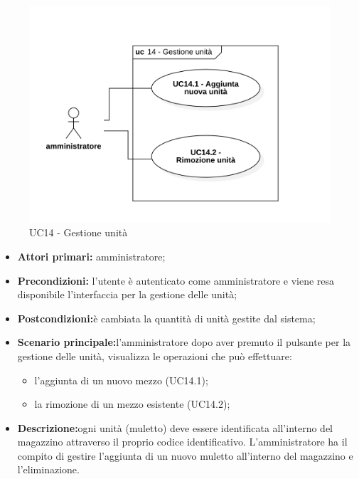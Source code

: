 \begin{figure}[H]
	\centering
	\includegraphics[scale=0.52]{res/images/uc14.png}
	\caption{UC14 - Gestione unità}
\end{figure}

\begin{itemize}
	\item 	\textbf{Attori primari:} amministratore;
	\item 	\textbf{Precondizioni:} l’utente è autenticato come amministratore e viene resa disponibile l’interfaccia per la gestione delle unità;
	\item 	\textbf{Postcondizioni:}è cambiata la quantità di unità gestite dal sistema;
	\item 	\textbf{Scenario principale:}l’amministratore dopo aver premuto il pulsante per la gestione delle unità, visualizza le operazioni che può effettuare:
	\begin{itemize}
		\item l’aggiunta di un nuovo mezzo (UC14.1);
		\item la rimozione di un mezzo esistente (UC14.2);
	\end{itemize}
	\item 	\textbf{Descrizione:}ogni unità (muletto) deve essere identificata all’interno del magazzino attraverso il proprio codice identificativo. L’amministratore ha il compito di gestire l’aggiunta di un nuovo muletto all’interno del magazzino e l’eliminazione.
\end{itemize}

